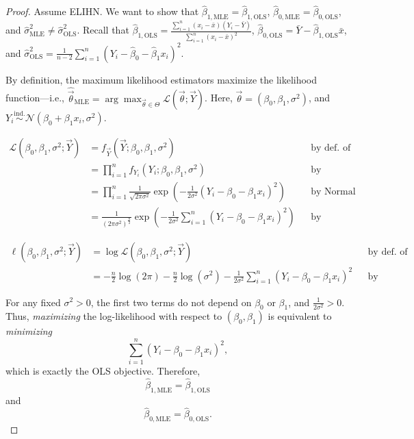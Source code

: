 \documentclass[12pt,oneside]{article}
\newcommand{\Like}{\mathcal{L}}
\newcommand{\MLE}{\text{MLE}}
\newcommand{\OLS}{\text{OLS}}
\newcommand{\N}{\mathcal{N}}
\newcommand{\simind}{\overset{\text{ind.}}{\sim}}
\theoremstyle{definition}
\theoremstyle{remark}
\begin{document}
\begin{proof}
Assume ELIHN. We want to show that $\hat{\beta}_{1, \MLE} = \hat{\beta}_{1, \OLS}$, $\hat{\beta}_{0, \MLE} = \hat{\beta}_{0, \OLS}$, and $\hat{\sigma}^2_{\MLE} \neq \hat{\sigma}^2_{\OLS}$. Recall that $\hat{\beta}_{1, \OLS} = \frac{\sum_{i = 1}^{n} (x_i - \bar{x})(Y_i - \bar{Y})}{\sum_{i = 1}^{n} (x_i - \bar{x})^2}$, $\hat{\beta}_{0, \OLS} = \bar{Y} - \hat{\beta}_{1, \OLS} \bar{x}$, and $\hat{\sigma}^2_{\OLS} = \frac{1}{n - 2} \sum_{i = 1}^{n} (Y_i - \hat{\beta}_0 - \hat{\beta}_1 x_i)^2$.

By definition, the maximum likelihood estimators maximize the likelihood function—i.e., $\widehat{\vec{\theta}}_{\MLE} = \arg \max_{\vec{\theta} \in \Theta} \Like(\vec{\theta}; \vec{Y})$. Here, $\vec{\theta} = (\beta_0, \beta_1, \sigma^2)$, and $Y_i \simind \N(\beta_0 + \beta_1 x_i, \sigma^2)$.

\[
\begin{aligned}
\Like(\beta_0, \beta_1, \sigma^2; \vec{Y}) &= f_{\vec{Y}}(\vec{Y}; \beta_0, \beta_1, \sigma^2) && \text{by def. of likelihood} \\
&= \prod_{i = 1}^{n} f_{Y_i}(Y_i; \beta_0, \beta_1, \sigma^2) && \text{by independence} \\
&= \prod_{i = 1}^{n} \frac{1}{\sqrt{2 \pi \sigma^2}} \exp \left(
- \frac{1}{2 \sigma^2} (Y_i - \beta_0 - \beta_1 x_i)^2 \right) && \text{by Normal PDF} \\
&= \frac{1}{(2 \pi \sigma^2)^{\frac{n}{2}}} \exp \left( - \frac{1}{2 \sigma^2} \sum_{i = 1}^{n} (Y_i - \beta_0 - \beta_1 x_i)^2 \right) && \text{by multiplying}
\end{aligned}
\]

\[
\begin{aligned}
\ell(\beta_0, \beta_1, \sigma^2; \vec{Y}) &= \log \Like(\beta_0, \beta_1, \sigma^2; \vec{Y}) && \text{by def. of log-likelihood} \\
&= - \frac{n}{2}\log(2\pi) - \frac{n}{2}\log(\sigma^2) - \frac{1}{2\sigma^2} \sum_{i = 1}^{n} (Y_i - \beta_0 - \beta_1 x_i)^2 && \text{by simplifying}
\end{aligned}
\]

For any fixed $\sigma^2 > 0$, the first two terms do not depend on $\beta_0$ or $\beta_1$, and $\frac{1}{2\sigma^2} > 0$. Thus, \textit{maximizing} the log-likelihood with respect to $(\beta_0,\beta_1)$ is equivalent to \textit{minimizing} \[\sum_{i = 1}^{n} (Y_i - \beta_0 - \beta_1 x_i)^2,\] which is exactly the OLS objective. Therefore, \[\hat{\beta}_{1,\MLE} = \hat{\beta}_{1,\OLS}\] and \[\hat{\beta}_{0,\MLE} = \hat{\beta}_{0,\OLS}.\]


\end{proof}
\end{document}
